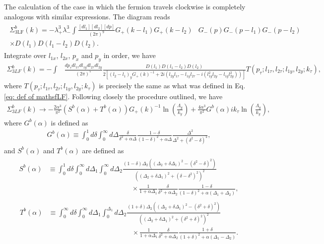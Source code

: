 \documentclass[prx,amsmath,amssymb, notitlepage, onecolumn,
nofootinbib,
superscriptaddress,
longbibliography
]{revtex4-1}
\newcommand{\beq}{\begin{eqnarray}}
\newcommand{\eeq}{\end{eqnarray}}
\begin{document}
The calculation of the case in which the fermion travels clockwise is completely analogous with similar expressions. The diagram reads
\beq
\begin{split}
\Sigma_{\text{3LF}}^b(k) = -\lambda_+^3 \lambda_-^3 \int\frac{[dl_1][dl_2][dp]}{(2\pi)^9}G_+(k-l_1) G_+(k-l_2)&G_-(p)G_-(p-l_1) G_-(p-l_2)\\
\times D(l_1) D(l_1-l_2) D(l_2).
\end{split}
\eeq
Integrate over $l_{1x}$, $l_{2x}$, $p_x$ and $p_y$ in order, we have
\beq
\Sigma_{3LF}^b(k) = -\int&\frac{dp_\tau dl_{1\tau} dl_{1y} dl_{2\tau} dl_{2y}}{(2\pi)^5}\frac{D(l_1) D(l_1-l_2) D(l_2)}{2\left[ (l_2-l_1)_y G_+(k)^{-1} + 2i \left(l_{2y} l_{1\tau}-l_{1y} l_{2\tau}-i(l_{1y}^2 l_{2y}-l_{1y} l_{2y}^2)\right)\right]
}T(p_\tau; l_{1\tau}, l_{2\tau}; l_{1y}, l_{2y}; k_\tau),
\eeq
where $T(p_\tau; l_{1\tau}, l_{2\tau}; l_{1y}, l_{2y}; k_\tau)$ is precisely the same as what was defined in Eq. \eqref{eq: def of mathsfLF}. Following closely the procedure outlined, we have
\beq\label{eq: 3LFb div part}
\Sigma_{3LF}^b(k) \rightarrow -\frac{ 2\alpha^3}{\pi^2}\left(S^b(\alpha) + T^b(\alpha)\right)G_+(k)^{-1}\ln\left(\frac{\Lambda_y}{k_y}\right)+\frac{ 4\alpha^3}{\pi^2}G^b(\alpha)i k_\tau\ln\left(\frac{\Lambda_y}{k_y}\right),
\eeq
where $G^b(\alpha)$ is defined as
\beq\label{eq: def of Gb}
G^b(\alpha)\equiv \int_0^1 d \delta \int_0^\infty d\Delta \frac{\delta}{\delta^2+\alpha\Delta}\frac{1-\delta}{(1-\delta)^2+\alpha\Delta} \frac{\Delta^2}{\Delta^2+\left(\delta^2-\delta\right)^2},
\eeq
and $S^b(\alpha)$ and $T^b(\alpha)$ are defined as
\beq\label{eq: def of Sb}
\begin{split}
S^b(\alpha) &\equiv \int_0^1 d \delta \int_0^\infty d \Delta_1 \int_0^\infty d \Delta_2 \frac{(1-\delta)\Delta_2\left((\Delta_2+\delta\Delta_1)^2-(\delta^2-\delta)^2 \right)}{\left((\Delta_2+\delta\Delta_1)^2+(\delta-\delta^2)^2 \right)^2}\\
&\quad\quad\quad\quad\quad\quad\quad\quad\quad\quad\quad\quad\times\frac{1}{1 + \alpha\Delta_1}\frac{\delta}{\delta^{2} + \alpha\Delta_2}\frac{1-\delta}{(1-\delta)^2 + \alpha(\Delta_1+\Delta_2)},
\end{split}
\eeq
\beq\label{eq: def of Tb}
\begin{split}
T^b(\alpha) &\equiv \int_0^\infty d \delta \int_0^\infty d \Delta_1 \int_0^{\Delta_1} d \Delta_2 \frac{(1+\delta)\Delta_2\left((\Delta_2+\delta\Delta_1)^2-(\delta^2+\delta)^2 \right)}{\left((\Delta_2+\delta\Delta_1)^2+(\delta^2+\delta)^2 \right)^2}\\
&\quad\quad\quad\quad\quad\quad\quad\quad\quad\quad\quad\quad\times\frac{1}{1 + \alpha\Delta_1}\frac{\delta}{\delta^{2} + \alpha\Delta_2}\frac{1+\delta}{(1+\delta)^2 + \alpha(\Delta_1-\Delta_2)}.
\end{split}
\eeq
\end{document}

